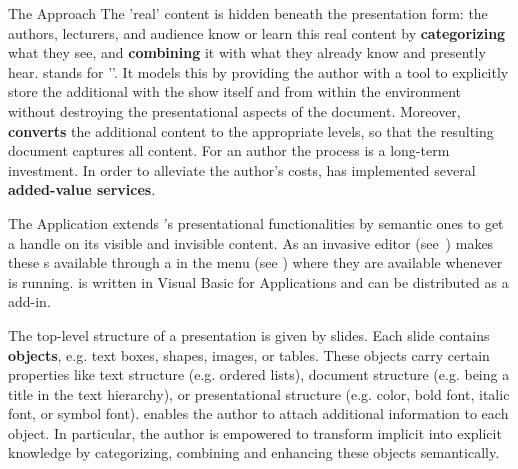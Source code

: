 \begin{omgroup}[id=cpoint,short=CPoint,creators=ako]
\begin{omgroup}[id=cpoint.background]{The {\cpoint} Approach}
The 'real' content is hidden beneath the presentation form: the authors, lecturers, and
audience know or learn this real content by {\bf categorizing} what they see, and {\bf
  combining} it with what they already know and presently hear. {\cpoint} stands for '{}'. It models this by
providing the author with a tool to explicitly store the additional {}
with the {\ppt} show itself and from within the {\ppt} environment without destroying the
presentational aspects of the {\ppt} document. Moreover, {\cpoint} {\bf converts} the
additional content to the appropriate {\omdoc} levels, so that the resulting {\omdoc}
document captures all content.  For an author the {} process is
a long-term investment. In order to alleviate the author's costs, {\cpoint} has
implemented several {\bf added-value services}.
\end{omgroup}

\begin{omgroup}[id=cpoint.app]{The {\cpoint} Application}
{\cpoint} extends {\ppt}'s
presentational functionalities by semantic ones to get a handle on its visible and
invisible content. As an invasive editor (see~\cite{Kohlhase:OvercomingProprietaryHurdles}) {\cpoint} makes these
{s} available through a {} in the
{\ppt} menu (see {}) where they are available whenever {\ppt} is
running. {\cpoint} is written in Visual Basic for Applications and can be distributed as a
{\ppt} add-in.

\begin{myfig}{menubar}{The {\cpoint} Menu Bar}
  \texttt{[image: \\projectsPath\{cpoint/CPointMenuBar]}}
\end{myfig}

The top-level structure of a {\ppt} presentation is given by slides.  Each slide contains
{\bf {\ppt} objects}, e.g. text boxes, shapes, images, or tables. These objects carry
certain properties like text structure (e.g. ordered lists), document structure
(e.g. being a title in the text hierarchy), or presentational structure (e.g. color, bold
font, italic font, or symbol font). {\cpoint} enables the author to attach additional
information to each {\ppt} object. In particular, the author is empowered to transform
implicit into explicit knowledge by categorizing, combining and enhancing these objects semantically.


\end{omgroup}
\end{omgroup}
